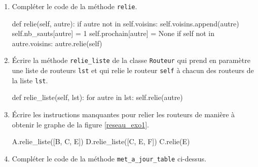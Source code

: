     \begin{enumerate}[series=monDS, resume]
        \item Compléter le code de la méthode \verb|relie|.

        \begin{blocvisible}[height=4.5]

    \begin{CodePythontexAlt}[TaillePolice=\large, Largeur=1\linewidth,Centre,Lignes=true,PremLigne=1]{}
def relie(self, autre): 
    if autre not in self.voisins: 
        self.voisins.append(autre) 
        self.nb_sauts[autre] = 1 
        self.prochain[autre] = None 
        if self not in autre.voisins: 
            autre.relie(self)
    \end{CodePythontexAlt}
\end{blocvisible}


        \item Écrire la méthode \verb|relie_liste| de la classe \verb|Routeur| qui prend en paramètre une liste de routeurs \verb|lst| et qui relie le routeur \verb|self| à chacun des routeurs de la liste \verb|lst|.
        
        \begin{blocvisible}[height=2.5]
    \begin{CodePythontexAlt}[TaillePolice=\large, Largeur=1\linewidth,Centre,Lignes=true,PremLigne=1]{}
def relie_liste(self, lst):
    for autre in lst: 
        self.relie(autre)
    \end{CodePythontexAlt}
\end{blocvisible}


    
\item Écrire les instructions manquantes pour relier les routeurs de manière à obtenir le graphe de la figure \ref{reseau_exo1}.

\begin{blocvisible}[height=2.5]
    \begin{CodePythontexAlt}[TaillePolice=\large, Largeur=1\linewidth,Centre,Lignes=true,PremLigne=1]{}
A.relie_liste([B, C, E]) 
D.relie_liste([C, E, F])
C.relie(E) 

\end{CodePythontexAlt}

\end{blocvisible}

    \item Compléter le code de la méthode \verb|met_a_jour_table| ci-dessus.
    

\end{enumerate}

